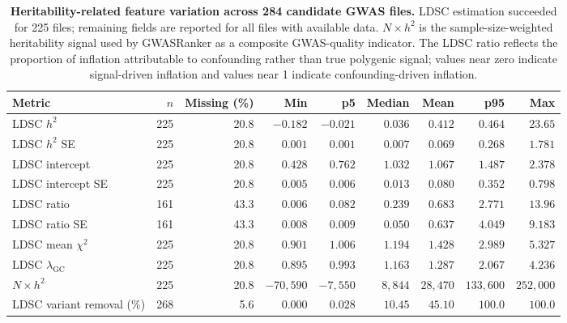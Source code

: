 \documentclass[11pt,a4paper]{article}
\begin{document}
\begin{table}[H]
\centering
\caption{\textbf{Heritability-related feature variation across 284 candidate GWAS files.} LDSC estimation succeeded for 225 files; remaining fields are reported for all files with available data. $N \times h^2$ is the sample-size-weighted heritability signal used by GWASRanker as a composite GWAS-quality indicator. The LDSC ratio reflects the proportion of inflation attributable to confounding rather than true polygenic signal; values near zero indicate signal-driven inflation and values near 1 indicate confounding-driven inflation.}
\label{tab}
\small
\begin{adjustbox}{max width=\textwidth}
\begin{tabular}{lrrrrrrrr}
\toprule
\textbf{Metric} & \textbf{$n$} & \textbf{Missing (\%)} & \textbf{Min} & \textbf{p5} & \textbf{Median} & \textbf{Mean} & \textbf{p95} & \textbf{Max} \\
\midrule
LDSC $h^2$                    & 225 & 20.8 & $-0.182$ & $-0.021$ & $0.036$ & $0.412$ & $0.464$ & $23.65$ \\
LDSC $h^2$ SE                 & 225 & 20.8 & $0.001$ & $0.001$ & $0.007$ & $0.069$ & $0.268$ & $1.781$ \\
LDSC intercept                & 225 & 20.8 & $0.428$ & $0.762$ & $1.032$ & $1.067$ & $1.487$ & $2.378$ \\
LDSC intercept SE             & 225 & 20.8 & $0.005$ & $0.006$ & $0.013$ & $0.080$ & $0.352$ & $0.798$ \\
LDSC ratio                    & 161 & 43.3 & $0.006$ & $0.082$ & $0.239$ & $0.683$ & $2.771$ & $13.96$ \\
LDSC ratio SE                 & 161 & 43.3 & $0.008$ & $0.009$ & $0.050$ & $0.637$ & $4.049$ & $9.183$ \\
LDSC mean $\chi^2$            & 225 & 20.8 & $0.901$ & $1.006$ & $1.194$ & $1.428$ & $2.989$ & $5.327$ \\
LDSC $\lambda_{\text{GC}}$    & 225 & 20.8 & $0.895$ & $0.993$ & $1.163$ & $1.287$ & $2.067$ & $4.236$ \\
$N \times h^2$                & 225 & 20.8 & $-70{,}590$ & $-7{,}550$ & $8{,}844$ & $28{,}470$ & $133{,}600$ & $252{,}000$ \\
LDSC variant removal (\%)     & 268 &  5.6 & $0.000$ & $0.028$ & $10.45$ & $45.10$ & $100.0$ & $100.0$ \\
\bottomrule
\end{tabular}
\end{adjustbox}
\end{table}
\end{document}

